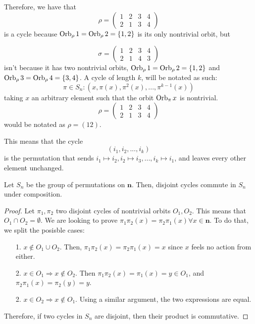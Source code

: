 Therefore, we have that 
\[
  \rho = 
  \begin{pmatrix}
    1 & 2 & 3 & 4 \\
    2 & 1 & 3 & 4
  \end{pmatrix}
\]
is a cycle because $\operatorname{Orb}_\rho 1 = \operatorname{Orb}_\rho 2 = \{1, 2\}$ is its only nontrivial orbit, but 

\[
  \sigma = 
  \begin{pmatrix}
    1 & 2 & 3 & 4 \\
    2 & 1 & 4 & 3
  \end{pmatrix}
\]
isn't because it has two nontrivial orbits, $\operatorname{Orb}_\rho 1 = \operatorname{Orb}_\rho 2 = \{1, 2\}$ and $\operatorname{Orb}_\rho 3 = \operatorname{Orb}_\rho 4 = \{3, 4\}$. A cycle of length $k$, will be notated as such: 
\[
  \pi \in S_n : (x, \pi(x), \pi^2(x), ..., \pi^{k - 1}(x))
\]
taking $x$ an arbitrary element such that the orbit $\operatorname{Orb}_\pi x$ is nontrivial.
\[
  \rho = 
  \begin{pmatrix}
    1 & 2 & 3 & 4 \\
    2 & 1 & 3 & 4
  \end{pmatrix}
\]
would be notated as $\rho = (1 2)$.

This means that the cycle 
\[
  (i_1, i_2, ..., i_k)
\]
is the permutation that sends $i_1 \mapsto i_2, i_2 \mapsto i_3, ..., i_k \mapsto i_1$, and leaves every other element unchanged.  

\begin{theorem*}
  Let $S_n$ be the group of permutations on $\mathbf{n}$. Then, disjoint cycles commute in $S_n$ under composition. 
\end{theorem*}
\begin{proof}
  Let $\pi_1, \pi_2$ two disjoint cycles of nontrivial orbits $O_1, O_2$. This means that $O_1 \cap O_2 = \emptyset$. We are looking to prove $\pi_1\pi_2(x) = \pi_2\pi_1(x) \forall x \in \mathbf{n}$. To do that, we split the posisble cases: 
  \begin{enumerate}
    \item[1.] $x \notin O_1 \cup O_2$. Then, $\pi_1\pi_2(x) = \pi_2\pi_1(x) = x$ since $x$ feels no action from either. 
    \item[2.] $x \in O_1 \Rightarrow x \notin O_2$. Then $\pi_1\pi_2(x) = \pi_1(x) = y \in O_1$, and $\pi_2\pi_1(x) = \pi_2(y) = y$. 
    \item[2.] $x \in O_2 \Rightarrow x \notin O_1$. Using a similar argument, the two expressions are equal.
  \end{enumerate}

  Therefore, if two cycles in $S_n$ are disjoint, then their product is commutative.
\end{proof}

